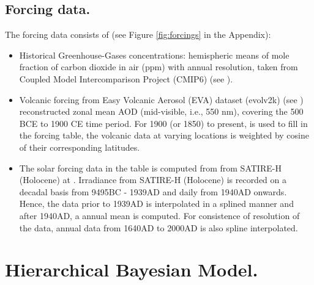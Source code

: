 \documentclass[11pt]{amsart}
\theoremstyle{plain}
\theoremstyle{definition}
\theoremstyle{remark}
\begin{document}
\subsection{Forcing data.}
The forcing data consists of (see Figure \ref{fig:forcings} in the Appendix):
\begin{itemize}
\item Historical Greenhouse-Gases concentrations: hemispheric means of mole
  fraction of carbon dioxide in air (ppm) with annual
  resolution, taken from Coupled Model Intercomparison Project (CMIP6) (see
  \cite{Meinshausen2016}).
  
\item Volcanic forcing from Easy Volcanic Aerosol (EVA) dataset (evolv2k) (see
  \cite{Toohey2016}) reconstructed zonal mean AOD (mid-visible, i.e., 550 nm), covering the
  500 BCE to 1900 CE time period. For 1900 (or 1850) to present, \cite{Thomason2016} is
  used to fill in the forcing table, the volcanic data at varying locations is
  weighted by cosine of their corresponding latitudes.
  
\item The solar forcing data in the table is computed from from SATIRE-H
  (Holocene) at \cite{Vieira2011}. Irradiance from SATIRE-H (Holocene) is recorded on a decadal basis from 9495BC - 1939AD and daily from 1940AD onwards. Hence, the data prior to 1939AD is interpolated in a splined manner and after 1940AD, a annual mean is computed. For consistence of resolution of the data, annual data from 1640AD to 2000AD is also spline interpolated.
\end{itemize}

\section{Hierarchical Bayesian Model.}
\label{sec:model}
\end{document}
